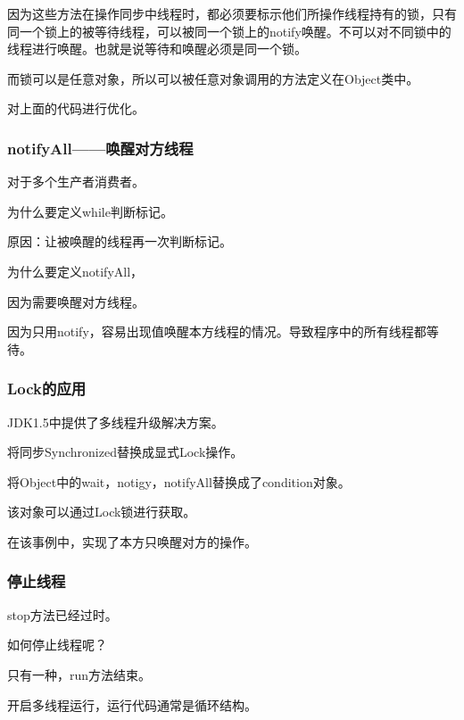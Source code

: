\documentclass[UTF8]{ctexart}
\begin{document}
因为这些方法在操作同步中线程时，都必须要标示他们所操作线程持有的锁，只有同一个锁上的被等待线程，可以被同一个锁上的notify唤醒。不可以对不同锁中的线程进行唤醒。也就是说等待和唤醒必须是同一个锁。

而锁可以是任意对象，所以可以被任意对象调用的方法定义在Object类中。



对上面的代码进行优化。



\subsubsection{notifyAll——唤醒对方线程}

对于多个生产者消费者。

为什么要定义while判断标记。

原因：让被唤醒的线程再一次判断标记。

为什么要定义notifyAll，

因为需要唤醒对方线程。

因为只用notify，容易出现值唤醒本方线程的情况。导致程序中的所有线程都等待。



\subsubsection{Lock的应用}

JDK1.5中提供了多线程升级解决方案。

将同步Synchronized替换成显式Lock操作。

将Object中的wait，notigy，notifyAll替换成了condition对象。

该对象可以通过Lock锁进行获取。

在该事例中，实现了本方只唤醒对方的操作。



\subsubsection{停止线程}

stop方法已经过时。

如何停止线程呢？

只有一种，run方法结束。

开启多线程运行，运行代码通常是循环结构。
\end{document}
